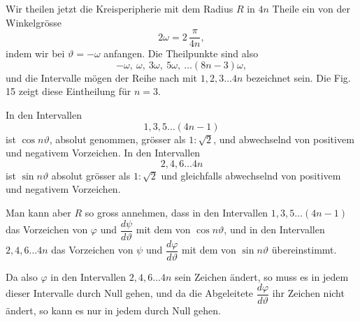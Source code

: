 
Wir theilen jetzt die Kreisperipherie mit dem Radius $R$ in
$4n$ Theile ein von der Winkelgrösse
\[
2\omega = 2\,\frac{\pi}{4n},
\]
indem wir bei $\vartheta = -\omega$ anfangen. Die Theilpunkte sind also
\[
-\omega,\ \omega,\ 3\omega,\ 5\omega,\ \dots (8n - 3)\omega,
\]
und die Intervalle mögen der Reihe nach mit $1, 2, 3 \dots 4n$
bezeichnet sein. Die Fig. 15 zeigt diese Eintheilung für $n = 3$.


In den Intervallen
\[
1, 3, 5 \dots (4n - 1)
\]
ist $\cos n\vartheta$, absolut genommen, grösser als $1 : \sqrt{2}$, und
abwechselnd von positivem und negativem Vorzeichen. In den
Intervallen
\[
2, 4, 6 \dots 4n
\]
ist $\sin n\vartheta$ absolut grösser als $1 : \sqrt{2}$ und gleichfalls
abwechselnd von positivem und negativem Vorzeichen.

Man kann aber $R$ so gross annehmen, dass in den Intervallen
$1, 3, 5 \dots (4n - 1)$ das Vorzeichen von $\varphi$ und $\dfrac{d\psi}{d\vartheta}$ mit dem
von $\cos n\vartheta$, und in den Intervallen $2, 4, 6 \dots 4n$ das Vorzeichen
von $\psi$ und $\dfrac{d\varphi}{d\vartheta}$ mit dem von $\sin n\vartheta$ übereinstimmt.

Da also $\varphi$ in den Intervallen $2, 4, 6 \dots 4n$ sein Zeichen
ändert, so muss es in jedem dieser Intervalle durch Null gehen,
und da die Abgeleitete $\dfrac{d\varphi}{d\vartheta}$ ihr Zeichen nicht ändert, so kann
es nur  in jedem durch Null gehen.
